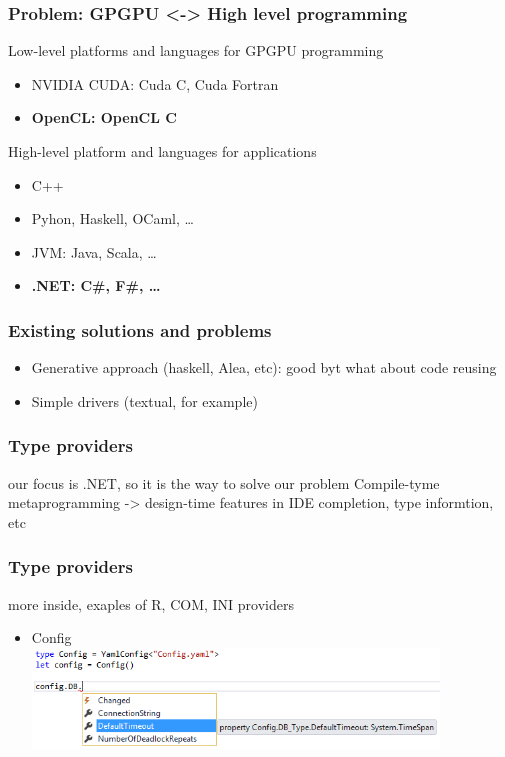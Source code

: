 \documentclass[xcolor=table]{beamer}
\begin{document}
\begin{frame}[fragile]
  \transwipe[direction=90]
  \frametitle{Problem: GPGPU <-> High level programming}
\begin{minipage}[m]{0.45\linewidth}
Low-level platforms and languages for GPGPU programming
\begin{itemize}
\item NVIDIA CUDA: Cuda C, Cuda Fortran
\item \textbf{OpenCL: OpenCL C}
\end{itemize}
\end{minipage}\hfill
\begin{minipage}[m]{0.45\linewidth}
High-level platform and languages for applications
\begin{itemize}
      \item C++
      \item Pyhon, Haskell, OCaml, \dots
      \item JVM: Java, Scala, \dots 
      \item \textbf{.NET: C\#, F\#, \dots}
\end{itemize}
\end{minipage}
\end{frame}

\begin{frame}[fragile]
  \transwipe[direction=90]
  \frametitle{Existing solutions and problems}
  \begin{itemize}
  \item Generative approach (haskell, Alea, etc): good byt what about code reusing
  \item Simple drivers (textual, for example)
  \end{itemize}
\end{frame}

\begin{frame}
  \transwipe[direction=90]
  \frametitle{Type providers}
  our focus is .NET, so it is the way to solve our problem
  Compile-tyme metaprogramming -> design-time features in IDE
  completion, type informtion, etc
\end{frame}

\begin{frame}
  \transwipe[direction=90]
  \frametitle{Type providers}
  more inside, exaples of R, COM, INI providers
  \begin{itemize}
    \item Config \\
     {\includegraphics[width=0.85\textwidth]{pictures/YamlConfigProvider.png}}
  \end{itemize}
\end{frame}
\end{document}
